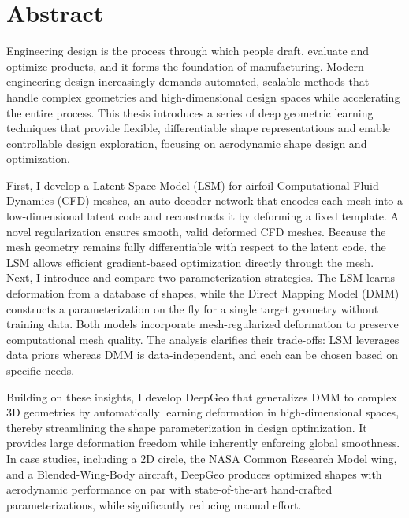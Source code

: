 

\cleardoublepage
\chapter*{Abstract}

Engineering design is the process through which people draft, evaluate and optimize products, and it forms the foundation of manufacturing. Modern engineering design increasingly demands automated, scalable methods that handle complex geometries and high-dimensional design spaces while accelerating the entire process. This thesis introduces a series of deep geometric learning techniques that provide flexible, differentiable shape representations and enable controllable design exploration, focusing on aerodynamic shape design and optimization. 

First, I develop a Latent Space Model (LSM) for airfoil Computational Fluid Dynamics (CFD) meshes, an auto-decoder network that encodes each mesh into a low-dimensional latent code and reconstructs it by deforming a fixed template. A novel regularization ensures smooth, valid deformed CFD meshes. Because the mesh geometry remains fully differentiable with respect to the latent code, the LSM allows efficient gradient-based optimization directly through the mesh. Next, I introduce and compare two parameterization strategies. The LSM learns deformation from a database of shapes, while the Direct Mapping Model (DMM) constructs a parameterization on the fly for a single target geometry without training data. Both models incorporate mesh-regularized deformation to preserve computational mesh quality. The analysis clarifies their trade-offs: LSM leverages data priors whereas DMM is data-independent, and each can be chosen based on specific needs.

Building on these insights, I develop DeepGeo that generalizes DMM to complex 3D geometries by automatically learning deformation in high-dimensional spaces, thereby streamlining the shape parameterization in design optimization. It provides large deformation freedom while inherently enforcing global smoothness. In case studies, including a 2D circle, the NASA Common Research Model wing, and a Blended-Wing-Body aircraft, DeepGeo produces optimized shapes with aerodynamic performance on par with state-of-the-art hand-crafted parameterizations, while significantly reducing manual effort.

